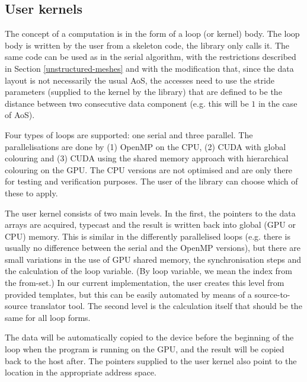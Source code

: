 

\subsection{User kernels}




The concept of a computation is in the form of a loop (or kernel) body. The loop
body is written by the user from a skeleton code, the library only calls it. The
same code can be used as in the serial algorithm, with the restrictions
described in Section \ref{unstructured-meshes} and with the modification that,
since the data layout is not necessarily the usual AoS, the accesses need to use
the stride parameters (supplied to the kernel by the library) that are defined
to be the distance between two consecutive data component (e.g. this will be $1$
in the case of AoS).

Four types of loops are supported: one serial and three parallel. The
parallelisations are done by (1) OpenMP on the CPU, (2) CUDA with global
colouring and (3) CUDA using the shared memory approach with hierarchical
colouring on the GPU. The CPU versions are not optimised and are only there for
testing and verification purposes. The user of the library can choose which of
these to apply.

The user kernel consists of two main levels. In the first, the pointers to the
data arrays are acquired, typecast and the result is written back into global
(GPU or CPU) memory. This is similar in the differently parallelised loops (e.g.
there is usually no difference between the serial and the OpenMP versions), but
there are small variations in the use of GPU shared memory, the synchronisation
steps and the calculation of the loop variable. (By loop variable, we mean the
index from the from-set.) In our current implementation, the user creates this
level from provided templates, but this can be easily automated by means of a
source-to-source translator tool. The second level is the calculation itself
that should be the same for all loop forms.

The data will be automatically copied to the device before the beginning of the
loop when the program is running on the GPU, and the result will be copied back
to the host after. The pointers supplied to the user kernel also point to the
location in the appropriate address space.

